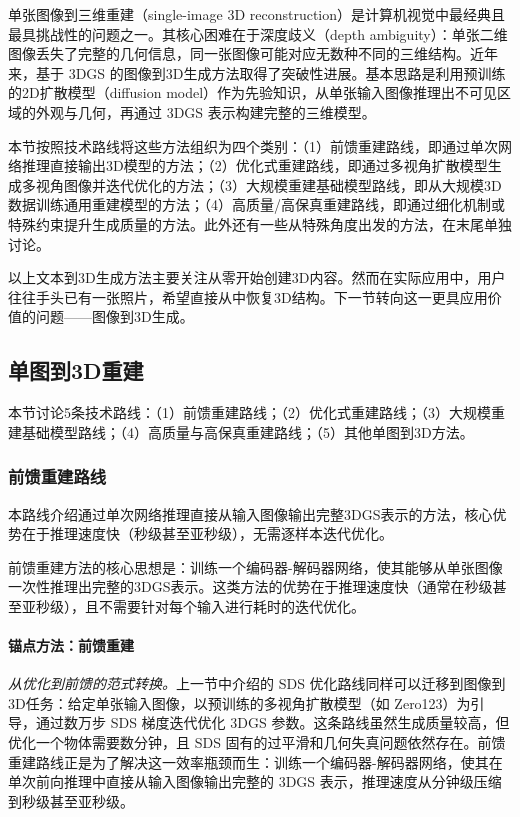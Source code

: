 单张图像到三维重建（single-image 3D reconstruction）是计算机视觉中最经典且最具挑战性的问题之一。其核心困难在于深度歧义（depth ambiguity）：单张二维图像丢失了完整的几何信息，同一张图像可能对应无数种不同的三维结构。近年来，基于 3DGS 的图像到3D生成方法取得了突破性进展。基本思路是利用预训练的2D扩散模型（diffusion model）作为先验知识，从单张输入图像推理出不可见区域的外观与几何，再通过 3DGS 表示构建完整的三维模型。

本节按照技术路线将这些方法组织为四个类别：（1）前馈重建路线，即通过单次网络推理直接输出3D模型的方法；（2）优化式重建路线，即通过多视角扩散模型生成多视角图像并迭代优化的方法；（3）大规模重建基础模型路线，即从大规模3D数据训练通用重建模型的方法；（4）高质量/高保真重建路线，即通过细化机制或特殊约束提升生成质量的方法。此外还有一些从特殊角度出发的方法，在末尾单独讨论。

以上文本到3D生成方法主要关注从零开始创建3D内容。然而在实际应用中，用户往往手头已有一张照片，希望直接从中恢复3D结构。下一节转向这一更具应用价值的问题——图像到3D生成。

\subsection{单图到3D重建}
\label{sec:08_2_1}

本节讨论5条技术路线：（1）前馈重建路线；（2）优化式重建路线；（3）大规模重建基础模型路线；（4）高质量与高保真重建路线；（5）其他单图到3D方法。

\subsubsection{前馈重建路线}
\label{sec:08_2_1_1}

本路线介绍通过单次网络推理直接从输入图像输出完整3DGS表示的方法，核心优势在于推理速度快（秒级甚至亚秒级），无需逐样本迭代优化。

前馈重建方法的核心思想是：训练一个编码器-解码器网络，使其能够从单张图像一次性推理出完整的3DGS表示。这类方法的优势在于推理速度快（通常在秒级甚至亚秒级），且不需要针对每个输入进行耗时的迭代优化。

\paragraph{锚点方法：前馈重建}

\textit{从优化到前馈的范式转换。}\;上一节中介绍的 SDS 优化路线同样可以迁移到图像到3D任务：给定单张输入图像，以预训练的多视角扩散模型（如 Zero123）为引导，通过数万步 SDS 梯度迭代优化 3DGS 参数。这条路线虽然生成质量较高，但优化一个物体需要数分钟，且 SDS 固有的过平滑和几何失真问题依然存在。前馈重建路线正是为了解决这一效率瓶颈而生：训练一个编码器-解码器网络，使其在单次前向推理中直接从输入图像输出完整的 3DGS 表示，推理速度从分钟级压缩到秒级甚至亚秒级。

